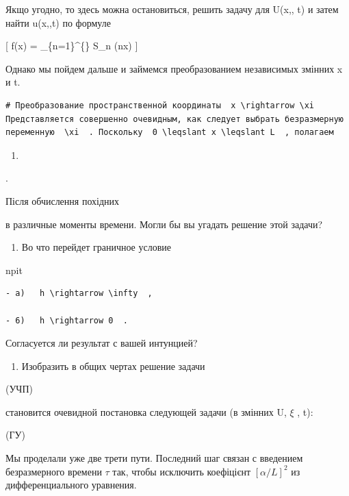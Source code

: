 \documentclass[
  ukrainian,
]{article}
\providecommand{\tightlist}{%
  \setlength{\itemsep}{0pt}\setlength{\parskip}{0pt}}
\begin{document}
Якщо угодно, то здесь можна остановиться, решить задачу для U\left(x,,
t\right) и затем найти u\left(x,,t\right) по формуле

{[} f(x) = \sum\_\{n=1\}\^{}\{\infty\} S\_n \sin(nx) {]}

Однако мы пойдем дальше и займемся преобразованием независимых змінних x
и t.

\begin{verbatim}
# Преобразование пространственной координаты  x \rightarrow \xi  Представляется совершенно очевидным, как следует выбрать безразмерную переменную  \xi  . Поскольку  0 \leqslant x \leqslant L  , полагаем
\end{verbatim}

\begin{enumerate}
\def\labelenumi{\arabic{enumi}.}
\tightlist
\item
\end{enumerate}

.

Після обчислення похідних

в различные моменты времени. Могли бы вы угадать решение этой задачи?

\begin{enumerate}
\def\labelenumi{\arabic{enumi}.}
\setcounter{enumi}{2}
\tightlist
\item
  Во что перейдет граничное условие
\end{enumerate}

npit

\begin{verbatim}
- a)   h \rightarrow \infty  ,

- 6)   h \rightarrow 0  .
\end{verbatim}

Согласуется ли результат с вашей интунцией?

\begin{enumerate}
\def\labelenumi{\arabic{enumi}.}
\setcounter{enumi}{3}
\tightlist
\item
  Изобразить в общих чертах решение задачи
\end{enumerate}

(УЧП)

становится очевидной постановка следующей задачи (в змінних U, \(\xi\) ,
t):

(ГУ)

Мы проделали уже две трети пути. Последний шаг связан с введением
безразмерного времени \(\tau\) так, чтобы исключить коефіцієнт
\([\alpha/L]^2\) из дифференциального уравнения.
\end{document}
